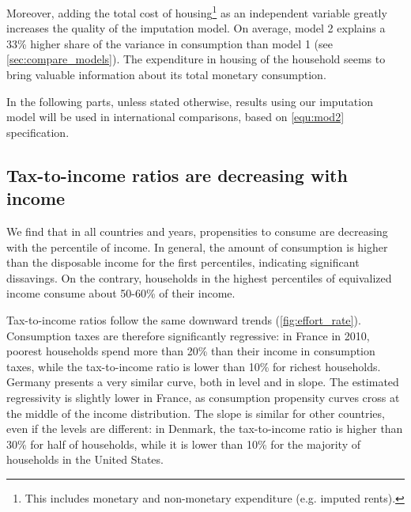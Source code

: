 \documentclass[12pt]{article}
\begin{document}
Moreover, adding the total cost of housing\footnote{This includes monetary and non-monetary expenditure (e.g. imputed rents).} as an independent variable greatly increases the quality of the imputation model. On average, model 2 explains a 33\% higher share of the variance in consumption than model 1 (see \cref{sec:compare_models}). The expenditure in housing of the household seems to bring valuable information about its total monetary consumption.

In the following parts, unless stated otherwise, results using our imputation model will be used in international comparisons, based on \eqref{equ:mod2} specification.

\subsection{Tax-to-income ratios are decreasing with income}
We find that in all countries and years, propensities to consume are decreasing with the percentile of income. In general, the amount of consumption is higher than the disposable income for the first percentiles, indicating significant dissavings. On the contrary, households in the highest percentiles of equivalized income consume about 50-60\% of their income. 

Tax-to-income ratios follow the same downward trends (\cref{fig:effort_rate}). Consumption taxes are therefore significantly regressive: in France in 2010, poorest households spend more than 20\% than their income in consumption taxes, while the tax-to-income ratio is lower than 10\% for richest households. Germany presents a very similar curve, both in level and in slope. The estimated regressivity is slightly lower in France, as consumption propensity curves cross at the middle of the income distribution. The slope is similar for other countries, even if the levels are different: in Denmark, the tax-to-income ratio is higher than 30\% for half of households, while it is lower than 10\% for the majority of households in the United States.
\end{document}

